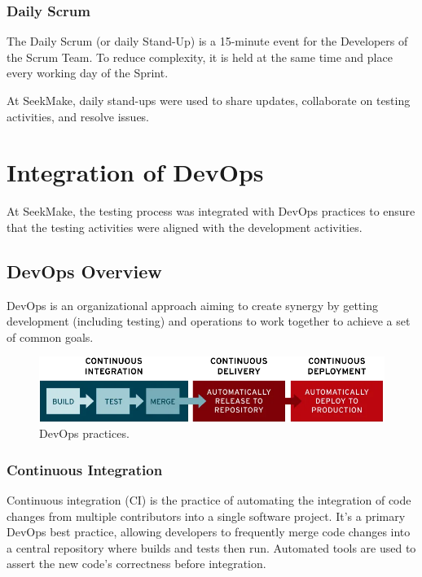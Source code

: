 \subsubsection{Daily Scrum}

The Daily Scrum (or daily Stand-Up) is a 15-minute event for the Developers of the Scrum Team. To reduce complexity, it is held at the same time and place every working day of the Sprint. \cite{scrum}

At SeekMake, daily stand-ups were used to share updates, collaborate on testing activities, and resolve issues.

\section{Integration of DevOps}
At SeekMake, the testing process was integrated with DevOps practices to ensure that the testing activities were aligned with the development activities.

\subsection{DevOps Overview}

DevOps is an organizational approach aiming to create synergy by getting development (including
testing) and operations to work together to achieve a set of common goals. \cite{istqbctfl4.0.1}

\begin{figure}[H]
    \centering
    \includegraphics[width=\textwidth]{project/images/ci-cd-flow-desktop.png}
    \caption{DevOps practices.}
    \label{fig:devops-practices}
\end{figure}

\subsubsection{Continuous Integration}

Continuous integration (CI) is the practice of automating the integration of code changes from multiple contributors into a single software project. It’s a primary DevOps best practice, allowing developers to frequently merge code changes into a central repository where builds and tests then run. Automated tools are used to assert the new code’s correctness before integration. \cite{atlassian}


